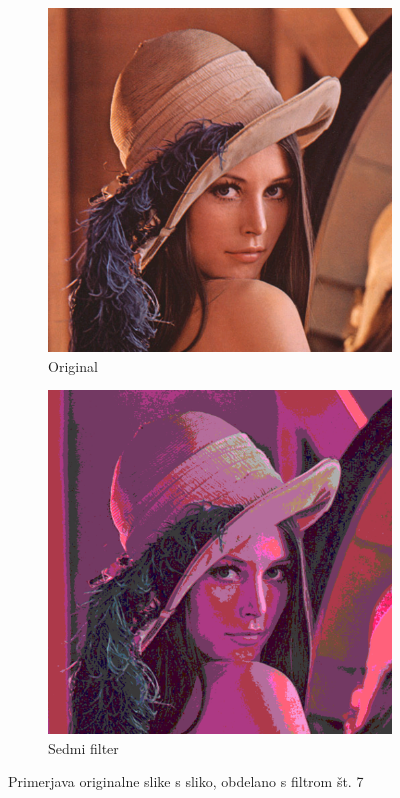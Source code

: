 \documentclass[a4paper, 12pt]{book}
\begin{document}
\begin{figure}[!ht]
    \centering
    \begin{subfigure}[b]{0.4\textwidth}
        \includegraphics[width=\textwidth]{lena}
        \caption{Original}
    \end{subfigure}
    \begin{subfigure}[b]{0.4\textwidth}
        \includegraphics[width=\textwidth]{lena_filter_7}
        \caption{Sedmi filter}
    \end{subfigure}
    \caption{Primerjava originalne slike s sliko, obdelano s filtrom št. 7}
    \label{fig:lena_filter_7}
\end{figure}
\end{document}
